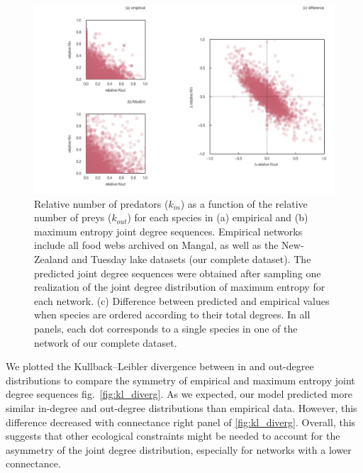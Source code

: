 \documentclass[11pt]{article}
\makeatletter
\def\maxwidth{\ifdim\Gin@nat@width>\linewidth\linewidth
\else\Gin@nat@width\fi}
\let\Oldincludegraphics\includegraphics
\renewcommand{\includegraphics}[1]{\Oldincludegraphics[width=\maxwidth]{#1}}
\makeatother
\begin{document}
\begin{figure}
\hypertarget{fig:joint_dd}{%
\centering
\includegraphics{figures/joint_degree_dist.png}
\caption{Relative number of predators (\(k_{in}\)) as a function of the
relative number of preys (\(k_{out}\)) for each species in (a) empirical
and (b) maximum entropy joint degree sequences. Empirical networks
include all food webs archived on Mangal, as well as the New-Zealand and
Tuesday lake datasets (our complete dataset). The predicted joint degree
sequences were obtained after sampling one realization of the joint
degree distribution of maximum entropy for each network. (c) Difference
between predicted and empirical values when species are ordered
according to their total degrees. In all panels, each dot corresponds to
a single species in one of the network of our complete
dataset.}\label{fig:joint_dd}
}
\end{figure}

We plotted the Kullback--Leibler divergence between in and out-degree
distributions to compare the symmetry of empirical and maximum entropy
joint degree sequences fig.~\ref{fig:kl_diverg}. As we expected, our
model predicted more similar in-degree and out-degree distributions than
empirical data. However, this difference decreased with connectance
right panel of \ref{fig:kl_diverg}. Overall, this suggests that other
ecological constraints might be needed to account for the asymmetry of
the joint degree distribution, especially for networks with a lower
connectance.
\end{document}
